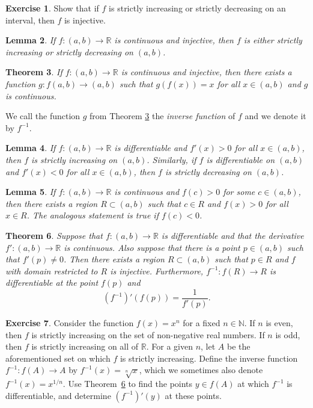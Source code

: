 \documentclass[12pt]{article}
\newcommand{\bbN}{\mathbb{N}}
\newcommand{\bbR}{\mathbb{R}}
\renewcommand{\_}[1]{\underline{ #1 }}
\newtheorem{theorem}{Theorem}[section]
\newtheorem{lemma}[theorem]{Lemma}
\theoremstyle{definition}
\newtheorem{exercise}[theorem]{Exercise}
\numberwithin{equation}{subsection}
\begin{document}
\begin{exercise}
Show that if $f$ is strictly increasing or strictly decreasing on an interval, then $f$ is injective.
\end{exercise}

\begin{lemma}
If $f:(a,b)\to\bbR$ is continuous and injective, then $f$ is either strictly increasing or strictly decreasing on $(a,b)$.
\end{lemma}

\begin{theorem}\label{invfun}
If $f:(a,b)\to\bbR$ is continuous and injective, then there exists a function $g:f(a,b)\to (a,b)$ such that $g(f(x))=x$ for all $x\in(a,b)$ and $g$ is continuous.
\end{theorem}

We call the function $g$ from Theorem \ref{invfun} the \emph{inverse function} of $f$ and we denote it by $f^{-1}$.

\begin{lemma}
If $f:(a,b)\to\bbR$ is differentiable and $f'(x)>0$ for all $x\in(a,b)$, then $f$ is strictly increasing on $(a,b)$. Similarly, if $f$ is differentiable on $(a,b)$ and $f'(x)<0$ for all $x\in(a,b)$, then $f$ is strictly decreasing on $(a,b)$.
\end{lemma}

\begin{lemma}
If $f:(a,b)\to\bbR$ is continuous and $f(c)>0$ for some $c\in(a,b)$, then there exists a region $R\subset (a,b)$ such that $c\in R$ and $f(x)>0$ for all $x\in R$. The analogous statement is true if $f(c)<0$.
\end{lemma}

\begin{theorem}\label{IFT}
Suppose that $f:(a,b)\to\bbR$ is differentiable and that the derivative $f':(a,b)\to\bbR$ is continuous. Also suppose that there is a point $p\in(a,b)$ such that $f'(p)\neq 0$. 
Then there exists a region $R\subset (a,b)$ such that $p\in R$ and $f$ with domain restricted to $R$ is injective. 
Furthermore, $f^{-1}:f(R)\to R$ is differentiable at the point $f(p)$ and
$$ (f^{-1})'(f(p))=\frac{1}{f'(p)} .$$
\end{theorem} 

\begin{exercise}
Consider the function $f(x)=x^n$ for a fixed $n\in\bbN$.  If $n$ is even, then $f$ is strictly increasing
on the set of non-negative real numbers.  If $n$ is odd, then $f$ is strictly increasing on all of $\bbR$.
For a given $n$, let $A$ be the aforementioned set on which $f$ is strictly increasing.  Define the
inverse function $f^{-1}:f(A)\rightarrow A$ by $f^{-1}(x)=\sqrt[n]{x}$, which we sometimes also
denote $f^{-1}(x)=x^{1/n}$.  Use Theorem\ \ref{IFT} to find the points $y\in f(A)$ at
which $f^{-1}$ is differentiable, and determine $(f^{-1})'(y)$ at these points.
\end{exercise}
\end{document}
